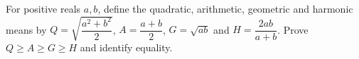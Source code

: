 For positive reals $a,b$, define the quadratic, arithmetic, geometric and harmonic means by $Q=\sqrt{\dfrac{a^2+b^2}{2}}$, $A=\dfrac{a+b}{2}$, $G=\sqrt{ab}$ and $H=\dfrac{2ab}{a+b}$. Prove $Q\ge A\ge G\ge H$ and identify equality.
